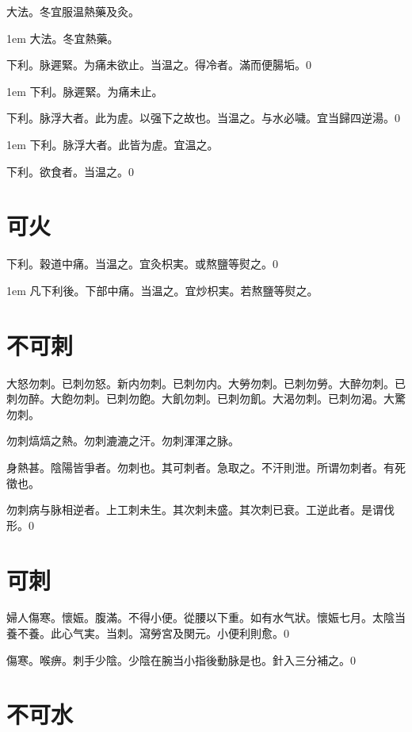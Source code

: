 大法。冬宜服温熱藥及灸。

\hangindent 1em
大法。冬宜熱藥。{\gaoben}

下利。脉遲緊。为痛未欲止。当温之。得冷者。滿而便腸垢。0

\hangindent 1em
下利。脉遲緊。为痛未止。{\gaoben}

下利。脉浮大者。此为虗。以强下之故也。当温之。与水必噦。{\khaaitp 宜当歸四逆湯。}0

\hangindent 1em
下利。脉浮大者。此皆为虗。宜温之。{\gaoben}

下利。欲食者。当温之。0

\section{可火}

下利。穀道中痛。当温之。宜灸枳実。或熬鹽等熨之。0

\hangindent 1em
凡下利後。下部中痛。当温之。宜炒枳実。若熬鹽等熨之。{\gaoben}

\section{不可刺}

大怒勿刺。{\khaaitp 已刺勿怒。}新内勿刺。{\khaaitp 已刺勿内。}大勞勿刺。{\khaaitp 已刺勿勞。}大醉勿刺。{\khaaitp 已刺勿醉。}大飽勿刺。{\khaaitp 已刺勿飽。大飢勿刺。已刺勿飢。}大渴勿刺。{\khaaitp 已刺勿渴。}大驚勿刺。

勿刺熇熇之熱。勿刺漉漉之汗。勿刺渾渾之脉。

身熱甚。陰陽皆爭者。勿刺也。其可刺者。急取之。不汗則泄。所谓勿刺者。有死徵也。

勿刺病与脉相逆者。上工刺未生。其次刺未盛。其次刺已衰。工逆此者。是谓伐形。0

\section{可刺}

婦人傷寒。懷娠。腹滿。不得小便。從腰以下重。如有水气狀。懷娠七月。太陰当養不養。此心气実。当刺。瀉勞宮及関元。小便利則愈。0

傷寒。喉痹。刺手少陰。少陰在腕当小指後動脉是也。針入三分補之。0

\section{不可水}

